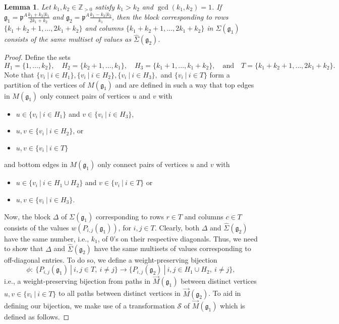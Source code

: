 \documentclass[letterpaper,10pt]{article}
\newtheorem{lemma}[theorem]{Lemma}
\begin{document}
\begin{lemma}\label{lem:blbbase1}
Let $k_1,k_2\in\mathbb{Z}_{>0}$ satisfy $k_1>k_2$ and $\gcd(k_1,k_2)=1$. If $\mathfrak{g}_1=\mathfrak{p}^A\frac{k_1+k_2|k_1}{2k_1+k_2}$ and $\mathfrak{g}_2=\mathfrak{p}^A\frac{k_1-k_2|k_2}{k_1}$, then the block corresponding to rows $\{k_1+k_2+1,\hdots,2k_1+k_2\}$ and columns $\{k_1+k_2+1,\hdots,2k_1+k_2\}$ in $\Sigma(\mathfrak{g}_1)$ consists of the same multiset of values as $\widehat{\Sigma}(\mathfrak{g}_2)$.
\end{lemma}
\begin{proof}
Define the sets $$H_1=\{1,\hdots,k_2\}, \quad H_2=\{k_2+1,\hdots,k_1\}, \quad H_3=\{k_1+1,\hdots,k_1+k_2\},\quad\text{and}\quad T=\{k_1+k_2+1,\hdots,2k_1+k_2\}.$$ Note that $\{v_i~|~i\in H_1\},\{v_i~|~i\in H_2\},\{v_i~|~i\in H_3\},$ and $\{v_i~|~i\in T\}$ form a partition of the vertices of $M(\mathfrak{g}_1)$ and are defined in such a way that top edges in $M(\mathfrak{g}_1)$ only connect pairs of vertices $u$ and $v$ with
\begin{itemize}
    \item  $u\in \{v_i~|~i\in H_1\}$ and $v\in \{v_i~|~i\in H_3\}$,
    \item $u,v\in \{v_i~|~i\in H_2\}$, or
    \item $u,v\in \{v_i~|~i\in T\}$
\end{itemize}
and bottom edges in $M(\mathfrak{g}_1)$ only connect pairs of vertices $u$ and $v$ with
\begin{itemize}
    \item $u\in\{v_i~|~i\in H_1\cup H_2\}$ and $v\in\{v_i~|~i\in T\}$ or
    \item $u,v\in \{v_i~|~i\in H_3\}$.
\end{itemize}
Now, the block $\Delta$ of $\Sigma(\mathfrak{g}_1)$ corresponding to rows $r\in T$ and columns $c\in T$ consists of the values $w(P_{i,j}(\mathfrak{g}_1))$, for $i,j\in T$. Clearly, both $\Delta$ and $\widehat{\Sigma}(\mathfrak{g}_2)$ have the same number, i.e., $k_1$, of 0's on their respective diagonals. Thus, we need to show that $\Delta$ and $\widehat{\Sigma}(\mathfrak{g}_2)$ have the same multisets of values corresponding to off-diagonal entries. To do so, we define a weight-preserving bijection 
$$\phi:~\{P_{i,j}(\mathfrak{g}_1)~|~i,j\in T,~i\neq j\}\to\{P_{i,j}(\mathfrak{g}_2)~|~i,j\in H_1\cup H_2,~i\neq j\},$$ i.e., a weight-preserving bijection from paths in $\overrightarrow{M}(\mathfrak{g}_1)$ between distinct vertices $u,v\in\{v_i~|~i\in T\}$ to all paths between distinct vertices in $\overrightarrow{M}(\mathfrak{g}_2)$. To aid in defining our bijection, we make use of a transformation $\mathcal{S}$ of $\overrightarrow{M}(\mathfrak{g}_1)$ which is defined as follows. 

\end{proof}
\end{document}
